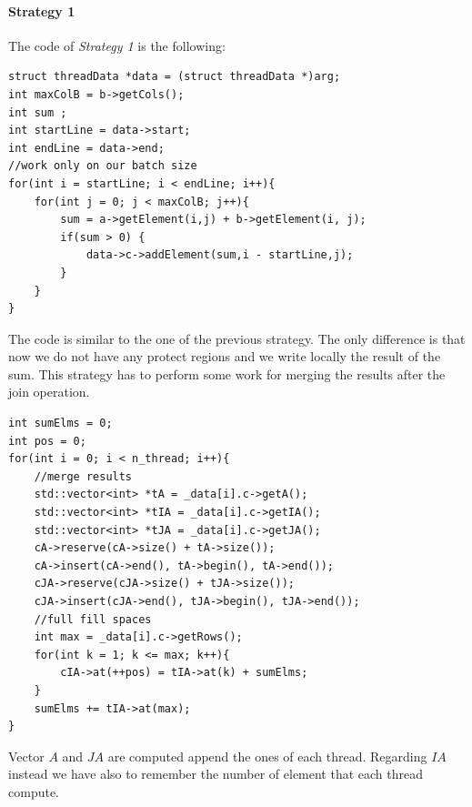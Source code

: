 \documentclass[]{article}
\begin{document}
\newpage
\label{strategy:1}
\paragraph{Strategy 1}
The code of \textit{Strategy 1} is the following:
\begin{lstlisting}[style=customc]
struct threadData *data = (struct threadData *)arg;
int maxColB = b->getCols();
int sum ;
int startLine = data->start;
int endLine = data->end;
//work only on our batch size
for(int i = startLine; i < endLine; i++){
    for(int j = 0; j < maxColB; j++){
        sum = a->getElement(i,j) + b->getElement(i, j);
        if(sum > 0) {
            data->c->addElement(sum,i - startLine,j);
        }
    }
}
\end{lstlisting}
The code is similar to the one of the previous strategy. The only difference is that now we do not have any protect regions and we write locally the result of the sum.
This strategy has to perform some work for merging the results after the join operation.
\begin{lstlisting}[style=customc]
int sumElms = 0;
int pos = 0;
for(int i = 0; i < n_thread; i++){
    //merge results
    std::vector<int> *tA = _data[i].c->getA();
    std::vector<int> *tIA = _data[i].c->getIA();
    std::vector<int> *tJA = _data[i].c->getJA();
    cA->reserve(cA->size() + tA->size());
    cA->insert(cA->end(), tA->begin(), tA->end());
    cJA->reserve(cJA->size() + tJA->size());
    cJA->insert(cJA->end(), tJA->begin(), tJA->end());
    //full fill spaces
    int max = _data[i].c->getRows();
    for(int k = 1; k <= max; k++){
        cIA->at(++pos) = tIA->at(k) + sumElms;
    }
    sumElms += tIA->at(max);
}
\end{lstlisting}
Vector $A$ and $JA$ are computed append the ones of each thread. Regarding $IA$ instead we have also to remember the number of element that each thread compute.
\newpage
\label{strategy:2}
\end{document}
